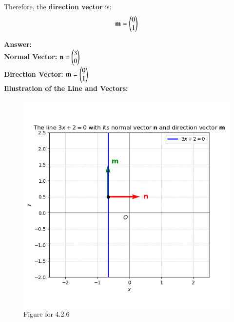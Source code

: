 \documentclass[journal]{IEEEtran}
\begin{document}
Therefore, the \textbf{direction vector} is:
\begin{align*}
\mathbf{m} = \begin{pmatrix} 0 \\ 1 \end{pmatrix}
\end{align*}

\bigskip

\textbf{Answer:}\\
\textbf{Normal Vector:} $\mathbf{n} = \begin{pmatrix} 3 \\ 0 \end{pmatrix}$ \\
\textbf{Direction Vector:} $\mathbf{m} = \begin{pmatrix} 0 \\ 1 \end{pmatrix}$\\



\textbf{Illustration of the Line and Vectors:}
\begin{figure}[h!]
    \centering
    \includegraphics[width=1.0\columnwidth]{figs/fig1.png}
    \caption{Figure for 4.2.6}
    \label{}
\end{figure}
\end{document}
